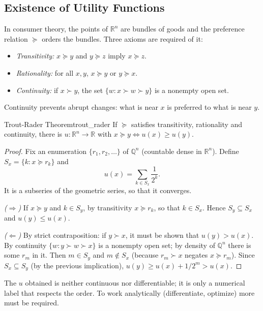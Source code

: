 \documentclass[11pt, a4paper]{article}
\begin{document}
\subsection{Existence of Utility Functions}

In consumer theory, the points of $\mathbb{R}^n$ are bundles of goods and the preference
relation $\succeq$ orders the bundles. Three axioms are required of it:
\begin{itemize}
    \item \textit{Transitivity:} $x \succeq y$ and $y \succeq z$ imply $x \succeq z$.
    \item \textit{Rationality:} for all $x, y$, $x \succeq y$ or $y \succeq x$.
    \item \textit{Continuity:} if $x \succ y$, the set $\{w : x \succ w \succ y\}$ is a nonempty
    open set.
\end{itemize}
Continuity prevents abrupt changes: what is near $x$ is preferred to what is near
$y$.

\begin{teorema}{Trout-Rader Theorem}{trout_rader}
If $\succeq$ satisfies transitivity, rationality and continuity, there is
$u: \mathbb{R}^n \to \mathbb{R}$ with $x \succeq y \iff u(x) \ge u(y)$.
\end{teorema}

\begin{proof}
Fix an enumeration $\{r_1, r_2, \dots\}$ of $\mathbb{Q}^n$ (countable dense in
$\mathbb{R}^n$). Define $S_x = \{k : x \succeq r_k\}$ and
$$ u(x) = \sum_{k \in S_x} \frac{1}{2^k}. $$
It is a subseries of the geometric series, so that it converges.

\textit{($\Rightarrow$)} If $x \succeq y$ and $k \in S_y$, by transitivity $x \succeq r_k$, so
that $k \in S_x$. Hence $S_y \subseteq S_x$ and $u(y) \le u(x)$.

\textit{($\Leftarrow$)} By strict contraposition: if $y \succ x$, it must be shown that
$u(y) > u(x)$. By continuity $\{w : y \succ w \succ x\}$ is a nonempty open set; by density of
$\mathbb{Q}^n$ there is some $r_m$ in it. Then $m \in S_y$ and $m \notin S_x$ (because $r_m \succ x$
negates $x \succeq r_m$). Since $S_x \subseteq S_y$ (by the previous implication),
$u(y) \ge u(x) + 1/2^m > u(x)$.
\end{proof}

\obs The $u$ obtained is neither continuous nor differentiable; it is only a numerical label that respects
the order. To work analytically (differentiate, optimize) more must be required.
\end{document}
